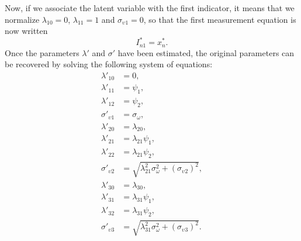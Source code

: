 \documentclass[12pt,a4paper]{article}
\begin{document}
Now, if we associate the latent variable with the first indicator, it means that we normalize
$\lambda_{10}=0$,
$\lambda_{11}=1$ and
$\sigma_{\upsilon 1} = 0$, so that the first measurement equation is  now written
\[
I^*_{n1} = x_{n}^*.
\]
Once the parameters $\lambda'$ and $\sigma'$ have been estimated, the original parameters can be recovered by solving the following system of equations:
\begin{align*}
  \lambda'_{1 0} &= 0, \\
  \lambda'_{1 1} &=\psi_1,\\
  \lambda'_{1 2} &=\psi_2, \\
  \sigma'_{\upsilon 1} &= \sigma_\omega,\\
  \lambda'_{2 0} &= \lambda_{2 0}, \\
  \lambda'_{2 1} &=\lambda_{2 1}\psi_1,\\
  \lambda'_{2 2} &=\lambda_{2 1}\psi_2, \\
  \sigma'_{\upsilon 2} &= \sqrt{\lambda_{2 1}^2\sigma_\omega^2 + (\sigma_{\upsilon 2})^2},\\
  \lambda'_{3 0} &= \lambda_{3 0}, \\
  \lambda'_{3 1} &=\lambda_{3 1}\psi_1,\\
  \lambda'_{3 2} &=\lambda_{3 1}\psi_2, \\
  \sigma'_{\upsilon 3} &= \sqrt{\lambda_{3 1}^2\sigma_\omega^2 + (\sigma_{\upsilon 3})^2}.
\end{align*}
\end{document}
